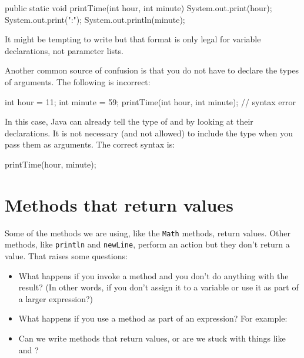\begin{code}
    public static void printTime(int hour, int minute) {
        System.out.print(hour);
        System.out.print(":");
        System.out.println(minute);
    }
\end{code}

It might be tempting to write  but that format is only legal for variable declarations, not parameter lists.

Another common source of confusion is that you do not have to declare the types of arguments.
The following is incorrect:

\begin{code}
    int hour = 11;
    int minute = 59;
    printTime(int hour, int minute);  // syntax error
\end{code}

In this case, Java can already tell the type of  and  by looking at their declarations.
It is not necessary (and not allowed) to include the type when you pass them as arguments.
The correct syntax is:

\begin{code}
    printTime(hour, minute);
\end{code}


\section{Methods that return values}


Some of the methods we are using, like the {\tt Math} methods, return values.
Other methods, like {\tt println} and {\tt newLine}, perform an action but they don't return a value.
That raises some questions:

\begin{itemize}

\item What happens if you invoke a method and you don't do anything with the result?
(In other words, if you don't assign it to a variable or use it as part of a larger expression?)

\item What happens if you use a  method as part of an expression? For example: 

\item Can we write methods that return values, or are we stuck with things like  and ?

\end{itemize}

